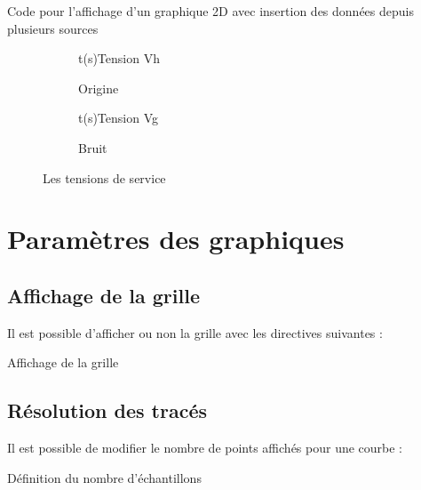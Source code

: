   
    \begin{Latex}{Code pour l'affichage d'un graphique 2D avec insertion des données depuis plusieurs sources}

      \begin{figure}[h!]  
        \centering 
          \begin{subfigure}[b]{0.4\linewidth}
            \begin{graphic}{0.8}{1}{0}{1.2}{-1}{5}{t(s)}{Tension V}{h}
              \end{graphic}%
            \caption{Origine} 
          \end{subfigure}
        \begin{subfigure}[b]{0.4\linewidth}
          \begin{graphic}{0.8}{1}{0}{4}{-0.3}{0.3}{t(s)}{Tension V}{g}
            \end{graphic}%
        \caption{Bruit}
        \end{subfigure}
        \caption{Les tensions de service}
        \end{figure}  
    \end{Latex}

  

\section{Paramètres des graphiques}

\subsection{Affichage de la grille}
Il est possible d'afficher ou non la grille avec les directives suivantes : 

\begin{Latex}{Affichage de la grille}
\enableGrid
\disableGrid
\end{Latex}


\subsection{Résolution des tracés}
Il est possible de modifier le nombre de points affichés pour une courbe :\\

\begin{Latex}{Définition du nombre d'échantillons}
\end{Latex}

